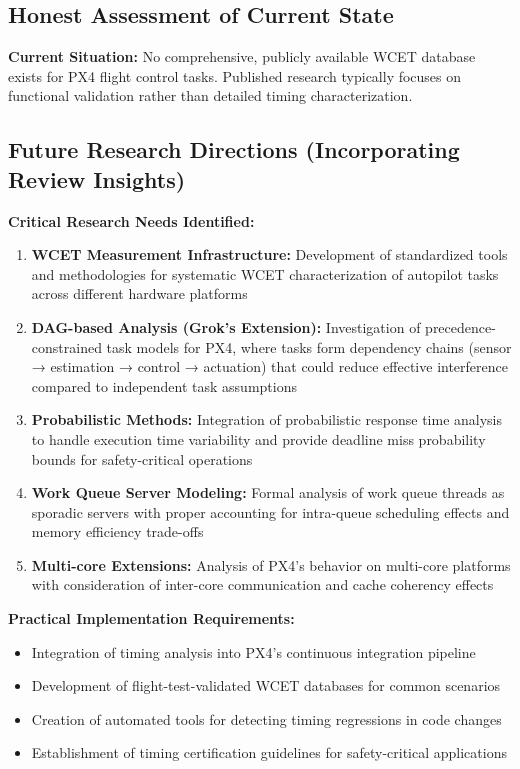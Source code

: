 \documentclass[12pt,a4paper]{article}
\begin{document}
\subsection{Honest Assessment of Current State}

\textbf{Current Situation:} No comprehensive, publicly available WCET database exists for PX4 flight control tasks. Published research typically focuses on functional validation rather than detailed timing characterization.

\subsection{Future Research Directions (Incorporating Review Insights)}

\textbf{Critical Research Needs Identified:}

\begin{enumerate}
\item \textbf{WCET Measurement Infrastructure:} Development of standardized tools and methodologies for systematic WCET characterization of autopilot tasks across different hardware platforms

\item \textbf{DAG-based Analysis (Grok's Extension):} Investigation of precedence-constrained task models for PX4, where tasks form dependency chains (sensor → estimation → control → actuation) that could reduce effective interference compared to independent task assumptions

\item \textbf{Probabilistic Methods:} Integration of probabilistic response time analysis to handle execution time variability and provide deadline miss probability bounds for safety-critical operations

\item \textbf{Work Queue Server Modeling:} Formal analysis of work queue threads as sporadic servers with proper accounting for intra-queue scheduling effects and memory efficiency trade-offs

\item \textbf{Multi-core Extensions:} Analysis of PX4's behavior on multi-core platforms with consideration of inter-core communication and cache coherency effects
\end{enumerate}

\textbf{Practical Implementation Requirements:}
\begin{itemize}
\item Integration of timing analysis into PX4's continuous integration pipeline
\item Development of flight-test-validated WCET databases for common scenarios
\item Creation of automated tools for detecting timing regressions in code changes
\item Establishment of timing certification guidelines for safety-critical applications
\end{itemize}
\end{document}
